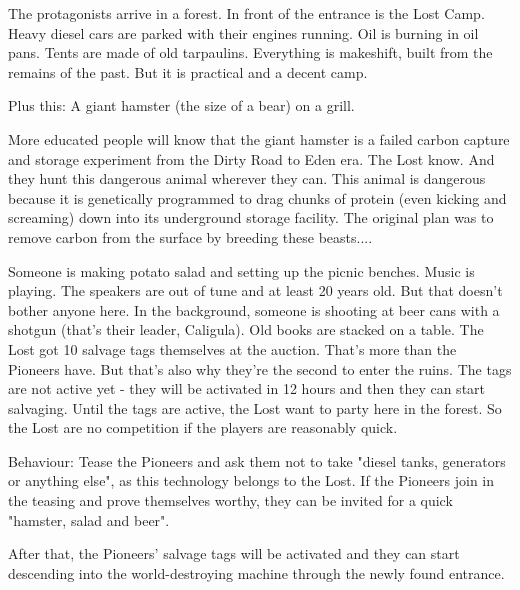The protagonists arrive in a forest. In front of the entrance is the Lost Camp. Heavy diesel cars are parked with their engines running. Oil is burning in oil pans. Tents are made of old tarpaulins. Everything is makeshift, built from the remains of the past. But it is practical and a decent camp.

Plus this: A giant hamster (the size of a bear) on a grill.

\begin{sidebarBox}[title=Failed CCS experiment: Hamster]
More educated people will know that the giant hamster is a failed carbon capture and storage experiment from the Dirty Road to Eden era. The Lost know. And they hunt this dangerous animal wherever they can. This animal is dangerous because it is genetically programmed to drag chunks of protein (even kicking and screaming) down into its underground storage facility. The original plan was to remove carbon from the surface by breeding these beasts....
\end{sidebarBox}

Someone is making potato salad and setting up the picnic benches. Music is playing.
The speakers are out of tune and at least 20 years old. But that doesn't bother anyone here. In the background, someone is shooting at beer cans with a shotgun (that's their leader, Caligula). Old books are stacked on a table.
The Lost got 10 salvage tags themselves at the auction. That's more than the Pioneers have. But that's also why they're the second to enter the ruins. The tags are not active yet - they will be activated in 12 hours and then they can start salvaging. Until the tags are active, the Lost want to party
here in the forest. So the Lost are no competition if the players are reasonably quick.

Behaviour: Tease the Pioneers and ask them not to take "diesel tanks, generators or anything else", as this technology belongs to the Lost. If the Pioneers join in the teasing and prove themselves worthy, they can be invited for a quick "hamster, salad and beer".

After that, the Pioneers' salvage tags will be activated and they can start descending into the world-destroying machine through the newly found entrance.

